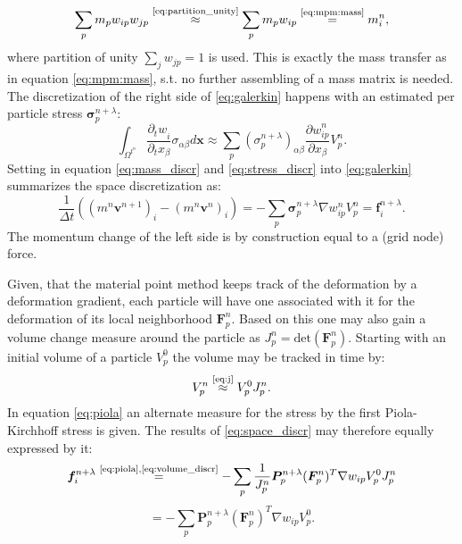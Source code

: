 \documentclass[m,times]{cgMA}
\begin{document}
\begin{equation}\label{eq:mass_discr}
\sum _ {  { p } }  { m } _ {  { p } }  { w } _ {ip}   w_{jp}
\stackrel{\text{\ref{eq:partition_unity}}}{\approx}
\sum_p m_p w_{ip}
\stackrel{\text{\ref{eq:mpm:mass}}}{=}
m_i^n,
\end{equation}
where partition of unity $\sum_j w_{jp} = 1$ is used. This is exactly the mass transfer as in equation \ref{eq:mpm:mass}, s.t. no further assembling of a mass matrix is needed.
The discretization of the right side of \ref{eq:galerkin} happens with an estimated per particle stress $\boldsymbol{\sigma}_p^{n+\lambda}$:
\begin{equation}\label{eq:stress_discr}
\int _ { \Omega ^ {  t^ n } }   \frac{\partial{_t w } _ { {i  }}}{\partial_tx_\beta }  \sigma _ {{ \alpha } \beta }  { d } \boldsymbol { x } \approx
\sum _ { p } (\sigma _ { p }^{n+\lambda}) _ { \alpha \beta } \frac{{ \partial w } _ { {ip}}^n}{ \partial x_\beta }  V _ { p } ^ { n }.
\end{equation}
Setting in equation \ref{eq:mass_discr} and \ref{eq:stress_discr} into \ref{eq:galerkin} summarizes the space discretization as:
\begin{equation}\label{eq:space_discr}
  \frac{1}{\Delta t} (({m^n\boldsymbol{v}^{n+1}})_i-({m^n\boldsymbol{v}^n})_i) =
  -\sum _ { p } \boldsymbol{\sigma} _ { p }^{n+\lambda} \nabla w_{ip}^n V _ { p } ^ { n }
  = \boldsymbol{f}_i^{n+\lambda}.
\end{equation}
The momentum change of the left side is by construction equal to a (grid node) force.

Given, that the material point method keeps track of the deformation by a deformation gradient, each particle will have one associated with it for the deformation of its local neighborhood $\boldsymbol{F}^n_p$. Based on this one may also gain a volume change measure around the particle as $J^n_p = \text{det}(\boldsymbol{F}^n_p)$. Starting with an initial volume of a particle $V_p^0$ the volume may be tracked in time by:
\begin{equation}\label{eq:volume_discr}
  V^n_p \stackrel{\text{\ref{eq:j}}}{\approx} V_p^0J^n_p.
\end{equation}
In equation \ref{eq:piola} an alternate measure for the stress by the first Piola-Kirchhoff stress is given. The results of \ref{eq:space_discr} may therefore equally expressed by it:
$$
\boldsymbol{f}^{n+\lambda}_i \stackrel{\text{\ref{eq:piola},\ref{eq:volume_discr}}}{=}
- \sum_p \frac{1}{J^n_p}\boldsymbol{P}^{n+\lambda}_{p}(\boldsymbol{F}^{n}_{p})^T \nabla w_{ip}V^0_pJ^n_p
$$
\begin{equation}\label{eq:force_disc}
  = - \sum_p \boldsymbol{P}^{n+\lambda}_{p}(\boldsymbol{F}^{n}_{p})^T \nabla w_{ip}V^0_p.
\end{equation}
\begin{flushright}\cite{MPM:COURSE} \cite{MPM:APIC} \cite{bathe2006finite}\end{flushright}
\end{document}
